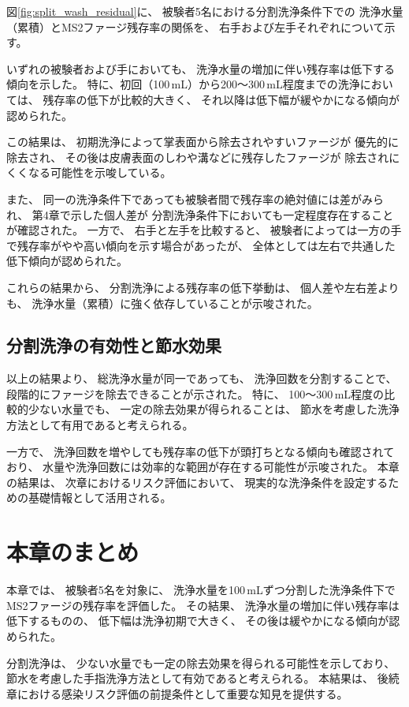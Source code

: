 図\ref{fig:split_wash_residual}に、
被験者5名における分割洗浄条件下での
洗浄水量（累積）とMS2ファージ残存率の関係を、
右手および左手それぞれについて示す。

いずれの被験者および手においても、
洗浄水量の増加に伴い残存率は低下する傾向を示した。
特に、初回（100\,mL）から200～300\,mL程度までの洗浄においては、
残存率の低下が比較的大きく、
それ以降は低下幅が緩やかになる傾向が認められた。

この結果は、
初期洗浄によって掌表面から除去されやすいファージが
優先的に除去され、
その後は皮膚表面のしわや溝などに残存したファージが
除去されにくくなる可能性を示唆している。

また、
同一の洗浄条件下であっても被験者間で残存率の絶対値には差がみられ、
第4章で示した個人差が
分割洗浄条件下においても一定程度存在することが確認された。
一方で、
右手と左手を比較すると、
被験者によっては一方の手で残存率がやや高い傾向を示す場合があったが、
全体としては左右で共通した低下傾向が認められた。

これらの結果から、
分割洗浄による残存率の低下挙動は、
個人差や左右差よりも、
洗浄水量（累積）に強く依存していることが示唆された。


\subsection{分割洗浄の有効性と節水効果}
以上の結果より、
総洗浄水量が同一であっても、
洗浄回数を分割することで、
段階的にファージを除去できることが示された。
特に、
100～300\,mL程度の比較的少ない水量でも、
一定の除去効果が得られることは、
節水を考慮した洗浄方法として有用であると考えられる。

一方で、
洗浄回数を増やしても残存率の低下が頭打ちとなる傾向も確認されており、
水量や洗浄回数には効率的な範囲が存在する可能性が示唆された。
本章の結果は、
次章におけるリスク評価において、
現実的な洗浄条件を設定するための基礎情報として活用される。


\section{本章のまとめ}
本章では、
被験者5名を対象に、
洗浄水量を100\,mLずつ分割した洗浄条件下で
MS2ファージの残存率を評価した。
その結果、
洗浄水量の増加に伴い残存率は低下するものの、
低下幅は洗浄初期で大きく、
その後は緩やかになる傾向が認められた。

分割洗浄は、
少ない水量でも一定の除去効果を得られる可能性を示しており、
節水を考慮した手指洗浄方法として有効であると考えられる。
本結果は、
後続章における感染リスク評価の前提条件として重要な知見を提供する。
